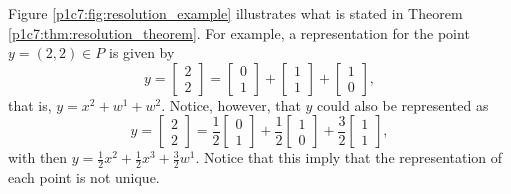 Figure \ref{p1c7:fig:resolution_example} illustrates what is stated in Theorem \ref{p1c7:thm:resolution_theorem}. For example,  a representation for the point $y = (2,2) \in P$ is given by
%
\begin{equation*}
	y = \begin{bmatrix} 2 \\ 2
		\end{bmatrix}= \begin{bmatrix} 0 \\ 1
		\end{bmatrix} + \begin{bmatrix} 1 \\ 1
		\end{bmatrix} + \begin{bmatrix} 1 \\ 0
		\end{bmatrix}, 	
\end{equation*}
%
that is, $y = x^2 + w^1 + w^2$. Notice, however, that $y$ could also be represented as 
%
\begin{equation*}
	y = \begin{bmatrix} 2 \\ 2
		\end{bmatrix}= \frac{1}{2}\begin{bmatrix} 0 \\ 1
		\end{bmatrix} + \frac{1}{2}\begin{bmatrix} 1 \\ 0
		\end{bmatrix} + \frac{3}{2}\begin{bmatrix} 1 \\ 1
		\end{bmatrix}, 	
\end{equation*}
%
with then $y = \frac{1}{2}x^2 + \frac{1}{2}x^3 + \frac{3}{2}w^1$. Notice that this imply that the representation of each point is not unique.

